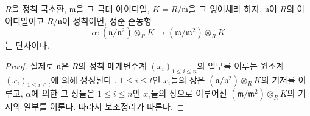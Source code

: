 \begin{lemma}[22.7.2.4]
\label{0.22.7.2.4-ko}
$R$을 정칙 국소환, $\mathfrak m$을 그 극대 아이디얼,
$K=R/\mathfrak m$을 그 잉여체라 하자. $\mathfrak n$이 $R$의
아이디얼이고 $R/\mathfrak n$이 정칙이면, 정준 준동형
\begin{equation}
\label{0.22.7.2.5-ko}
  \alpha:(\mathfrak n/\mathfrak n^2)\otimes_RK
  \longrightarrow(\mathfrak m/\mathfrak m^2)\otimes_RK
  \tag{22.7.2.5}
\end{equation}
는 단사이다.
\end{lemma}

\begin{proof}
실제로 $\mathfrak n$은 $R$의 정칙 매개변수계
$(x_i)_{1\leq i\leq n}$의 일부를 이루는 원소계
$(x_i)_{1\leq i\leq t}$에 의해 생성된다 .
$1\leq i\leq t$인 $x_i$들의 상은
$(\mathfrak n/\mathfrak n^2)\otimes_RK$의 기저를 이루고,
$\alpha$에 의한 그 상들은 $1\leq i\leq n$인 $x_i$들의 상으로
이루어진 $(\mathfrak m/\mathfrak m^2)\otimes_RK$의 기저의 일부를
이룬다. 따라서 보조정리가 따른다.
\end{proof}

